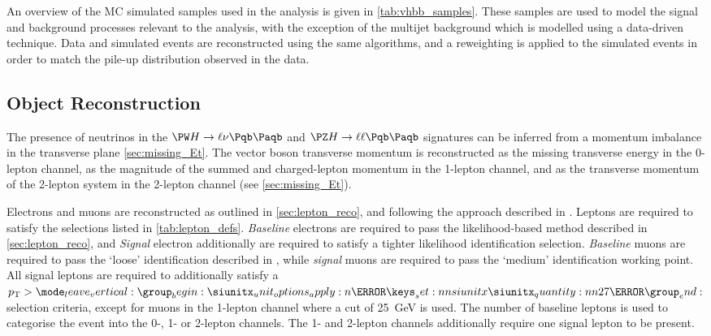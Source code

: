 An overview of the MC simulated samples used in the analysis is given in \cref{tab:vhbb_samples}.
These samples are used to model the signal and background processes relevant to the analysis, with the exception of the multijet background which is modelled using a data-driven technique.
Data and simulated events are reconstructed using the same algorithms, and a reweighting is applied to the simulated events in order to match the pile-up distribution
observed in the data.
%

%

\subsection{Object Reconstruction}\label{sec:vhbb_object_reco}

The presence of neutrinos in the $\Wboson \higgs \rightarrow \ell\nu \bbbar$ and $\Zboson \higgs \rightarrow \ell\ell \bbbar$ signatures can be inferred from a momentum imbalance in the transverse plane \cref{sec:missing_Et}.
The vector boson transverse momentum \ptv is reconstructed as the missing transverse energy \ETmiss in the 0-lepton channel, as the magnitude of the summed \vETmiss and charged-lepton momentum in the 1-lepton channel, and as the transverse momentum of the 2-lepton system in the 2-lepton channel (see \cref{sec:missing_Et}).

Electrons and muons are reconstructed as outlined in \cref{sec:lepton_reco}, and following the approach described in .
Leptons are required to satisfy the selections listed in \cref{tab:lepton_defs}.
\textit{Baseline} electrons are required to pass the likelihood-based method described in \cref{sec:lepton_reco},
and \textit{Signal} electron additionally are required to satisfy a tighter likelihood identification selection.
\textit{Baseline} muons are required to pass the `loose' identification described in , while \textit{signal} muons are required to pass the `medium' identification working point.
All signal leptons are required to additionally satisfy a $\pt > \SI{27}{\GeV}$ selection criteria, except for muons in the 1-lepton channel where a cut of \SI{25}{\GeV} is used.
The number of baseline leptons is used to categorise the event into the 0-, 1- or 2-lepton channels.
The 1- and 2-lepton channels additionally require one signal lepton to be present.

